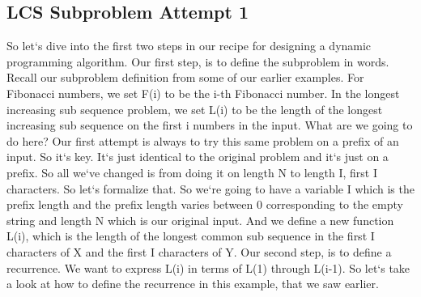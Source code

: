 \subsection{LCS  Subproblem Attempt 1}
So let`s dive into the first two steps in our recipe for designing a dynamic programming algorithm.
Our first step, is to define the subproblem in words.
Recall our subproblem definition from some of our earlier examples.
For Fibonacci numbers, we set F(i) to be the i-th Fibonacci number.
In the longest increasing sub sequence problem, we set L(i) to be the length of the longest increasing sub sequence on the first i numbers in the input.
What are we going to do here? Our first attempt is always to try this same problem on a prefix of an input.
So it`s key.
It`s just identical to the original problem and it`s just on a prefix.
So all we`ve changed is from doing it on length N to length I, first I characters.
So let`s formalize that.
So we`re going to have a variable I which is the prefix length and the prefix length varies between 0 corresponding to the empty string and length N which is our original input.
And we define a new function L(i), which is the length of the longest common sub sequence in the first I characters of X and the first I characters of Y\@.
Our second step, is to define a recurrence.
We want to express L(i) in terms of L(1) through L(i-1).
So let`s take a look at how to define the recurrence in this example, that we saw earlier.


